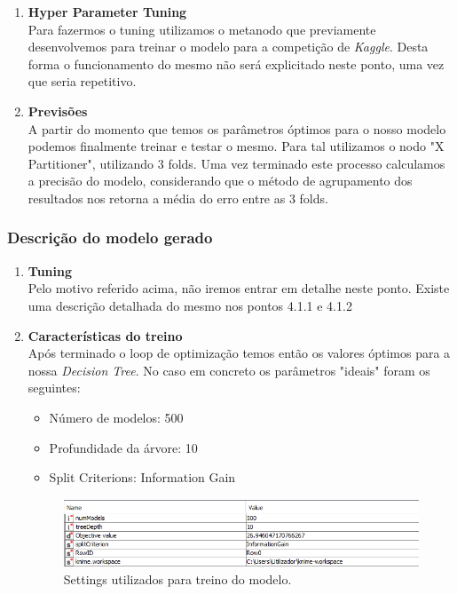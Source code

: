 \begin{enumerate}
        \item \textbf{Hyper Parameter Tuning} \\
            Para fazermos o tuning utilizamos o metanodo que previamente desenvolvemos para treinar o modelo para a competição de \textit{Kaggle}. Desta forma o funcionamento do mesmo não será explicitado neste ponto, uma vez que seria repetitivo.
        \item \textbf{Previsões} \\
            A partir do momento que temos os parâmetros óptimos para o nosso modelo podemos finalmente treinar e testar o mesmo. Para tal utilizamos o nodo "X Partitioner", utilizando 3 folds. Uma vez terminado este processo calculamos a precisão do modelo, considerando que o método de agrupamento dos resultados nos retorna a média do erro entre as 3 folds.
    \end{enumerate}
        
    \subsubsection{Descrição do modelo gerado}
        \begin{enumerate}
            \item \textbf{Tuning}\\
                Pelo motivo referido acima, não iremos entrar em detalhe neste ponto. Existe uma descrição detalhada do mesmo nos pontos 4.1.1 e 4.1.2
            \item \textbf{Características do treino}\\
                Após terminado o loop de optimização temos então os valores óptimos para a nossa \textit{Decision Tree}. No caso em concreto os parâmetros "ideais" foram os seguintes:
                \begin{itemize}
                    \item Número de modelos: 500
                    \item Profundidade da árvore: 10
                    \item Split Criterions: Information Gain
                \end{itemize}
                \begin{figure}[H]
                    \centering
                    \includegraphics[scale=0.30
                    ]{Figures/wf_lol_hyperdata.png}
                    \caption{Settings utilizados para treino do modelo.}
                    \label{fig:"um"}
                \end{figure} 
        \end{enumerate}